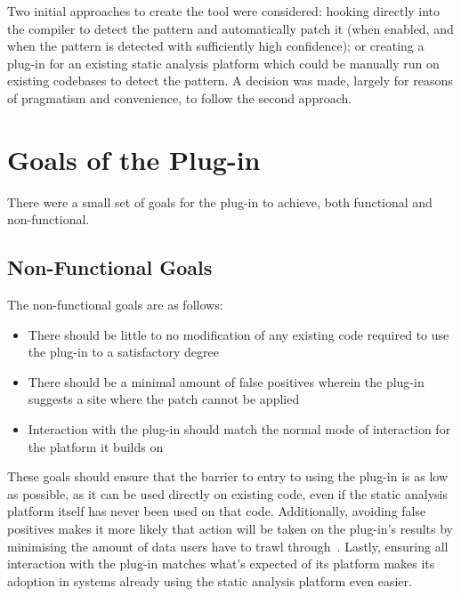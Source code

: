 Two initial approaches to create the tool were considered: hooking directly into the compiler to detect the pattern and automatically patch it (when enabled, and when the pattern is detected with sufficiently high confidence); or creating a plug-in for an existing static analysis platform which could be manually run on existing codebases to detect the pattern. A decision was made, largely for reasons of pragmatism and convenience, to follow the second approach.


\section{Goals of the Plug-in}


There were a small set of goals for the plug-in to achieve, both functional and non-functional.

\subsection{Non-Functional Goals}

The non-functional goals are as follows:

\begin{itemize}
	\item There should be little to no modification of any existing code required to use the plug-in to a satisfactory degree
	\item There should be a minimal amount of false positives wherein the plug-in suggests a site where the patch cannot be applied
	\item Interaction with the plug-in should match the normal mode of interaction for the platform it builds on
\end{itemize}

These goals should ensure that the barrier to entry to using the plug-in is as low as possible, as it can be used directly on existing code, even if the static analysis platform itself has never been used on that code. Additionally, avoiding false positives makes it more likely that action will be taken on the plug-in's results by minimising the amount of data users have to trawl through~\cite{infervideo}. Lastly, ensuring all interaction with the plug-in matches what's expected of its platform makes its adoption in systems already using the static analysis platform even easier.

